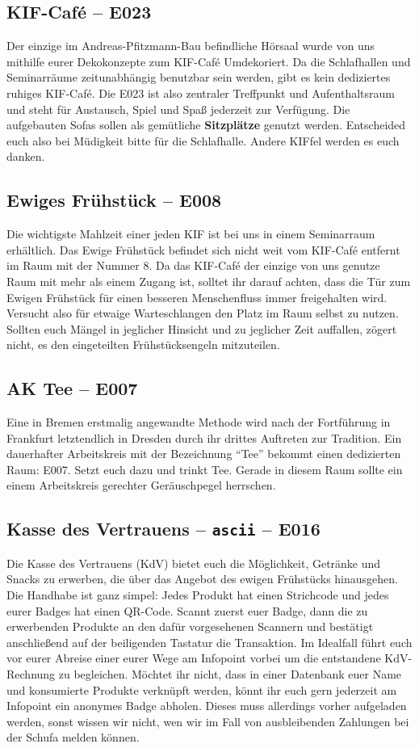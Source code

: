 \subsection*{KIF-Café -- E023}
Der einzige im Andreas-Pfitzmann-Bau befindliche Hörsaal wurde von uns mithilfe eurer Dekokonzepte zum KIF-Café Umdekoriert.
Da die Schlafhallen und Seminarräume zeitunabhängig benutzbar sein werden, gibt es kein dediziertes ruhiges KIF-Café.
Die E023 ist also zentraler Treffpunkt und Aufenthaltsraum und steht für Austausch, Spiel und Spaß jederzeit zur Verfügung.
Die aufgebauten Sofas sollen als gemütliche \textbf{Sitzplätze} genutzt werden.
Entscheided euch also bei Müdigkeit bitte für die Schlafhalle.
Andere KIFfel werden es euch danken.

\subsection*{Ewiges Frühstück -- E008}
Die wichtigste Mahlzeit einer jeden KIF ist bei uns in einem Seminarraum erhältlich.
Das Ewige Frühstück befindet sich nicht weit vom KIF-Café entfernt im Raum mit der Nummer 8.
Da das KIF-Café der einzige von uns genutze Raum mit mehr als einem Zugang ist, solltet ihr darauf achten, dass die Tür zum Ewigen Frühstück für einen besseren Menschenfluss immer freigehalten wird.
Versucht also für etwaige Warteschlangen den Platz im Raum selbst zu nutzen.
Sollten euch Mängel in jeglicher Hinsicht und zu jeglicher Zeit auffallen, zögert nicht, es den eingeteilten Frühstücksengeln mitzuteilen.

\subsection*{AK Tee -- E007}
Eine in Bremen erstmalig angewandte Methode wird nach der Fortführung in Frankfurt letztendlich in Dresden durch ihr drittes Auftreten zur Tradition.
Ein dauerhafter Arbeitskreis mit der Bezeichnung \enquote{Tee} bekommt einen dedizierten Raum: E007.
Setzt euch dazu und trinkt Tee.
Gerade in diesem Raum sollte ein einem Arbeitskreis gerechter Geräuschpegel herrschen.

\subsection*{Kasse des Vertrauens -- \texttt{ascii} -- E016}
Die Kasse des Vertrauens (KdV) bietet euch die Möglichkeit, Getränke und Snacks zu erwerben, die über das Angebot des ewigen Frühstücks hinausgehen.
Die Handhabe ist ganz simpel: Jedes Produkt hat einen Strichcode und jedes eurer Badges hat einen QR-Code.
Scannt zuerst euer Badge, dann die zu erwerbenden Produkte an den dafür vorgesehenen Scannern und bestätigt anschließend auf der beiligenden Tastatur die Transaktion.
Im Idealfall führt euch vor eurer Abreise einer eurer Wege am Infopoint vorbei um die entstandene KdV-Rechnung zu begleichen.
Möchtet ihr nicht, dass in einer Datenbank euer Name und konsumierte Produkte verknüpft werden, könnt ihr euch gern jederzeit am Infopoint ein anonymes Badge abholen.
Dieses muss allerdings vorher aufgeladen werden, sonst wissen wir nicht, wen wir im Fall von ausbleibenden Zahlungen bei der Schufa melden können.


